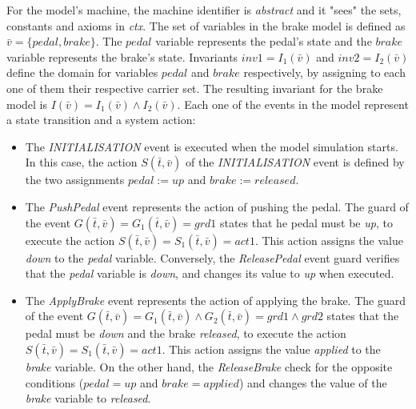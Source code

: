 For the model's machine, the machine identifier is \textit{abstract} and it "sees" the sets, constants and axioms in \textit{ctx}. The set of variables in the brake model is defined as $\bar{v} = \{pedal, brake\}$. The $pedal$ variable represents the pedal's state and the $brake$ variable represents the brake's state. Invariants $inv1 = I_1(\bar{v})$ and $inv2 = I_2(\bar{v})$ define the domain for variables $pedal$ and $brake$ respectively, by assigning to each one of them their respective carrier set. The resulting invariant for the brake model is $I(\bar{v}) = I_1(\bar{v}) \land I_2(\bar{v})$. Each one of the events in the model represent a state transition and a system action:
\begin{itemize}
    \item The \textit{INITIALISATION} event is executed when the model simulation starts. In this case, the action $S(\bar{t}, \bar{v})$ of the \textit{INITIALISATION} event is defined by the two assignments $pedal := up$ and $brake := released$.
     
    \item The \textit{PushPedal} event represents the action of pushing the pedal. The guard of the event $G(\bar{t}, \bar{v}) = G_1(\bar{t}, \bar{v}) = grd1$ states that he pedal must be \textit{up}, to execute the action $S(\bar{t}, \bar{v}) = S_1(\bar{t}, \bar{v}) = act1$. This action assigns the value \textit{down} to the \textit{pedal} variable. Conversely, the \textit{ReleasePedal} event guard verifies that the \textit{pedal} variable is \textit{down}, and changes its value to \textit{up} when executed.
    
    \item The \textit{ApplyBrake} event represents the action of applying the brake. The guard of the event $G(\bar{t}, \bar{v}) = G_1(\bar{t}, \bar{v}) \land G_2(\bar{t}, \bar{v}) = grd1 \land grd2$ states that the pedal must be \textit{down} and the brake \textit{released}, to execute the action $S(\bar{t}, \bar{v}) = S_1(\bar{t}, \bar{v}) = act1$. This action assigns the value \textit{applied} to the \textit{brake} variable. On the other hand, the \textit{ReleaseBrake} check for the opposite conditions ($pedal = up$ and $brake = applied$) and changes the value of the \textit{brake} variable to \textit{released}. 
\end{itemize}

